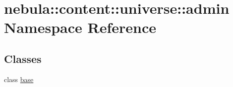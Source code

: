\hypertarget{namespacenebula_1_1content_1_1universe_1_1admin}{
\section{nebula::content::universe::admin Namespace Reference}
\label{namespacenebula_1_1content_1_1universe_1_1admin}
}
\subsection*{Classes}
\begin{DoxyCompactItemize}
\item 
class \hyperlink{classnebula_1_1content_1_1universe_1_1admin_1_1base}{base}
\end{DoxyCompactItemize}
